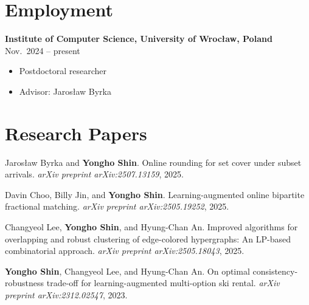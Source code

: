 \documentclass{article}
\newcommand{\killinitspace}{-0.7em}
\begin{document}
\section{Employment}
\textbf{Institute of Computer Science, University of Wrocław, Poland} \hfill Nov.~2024 -- present
\vspace{\killinitspace}
\begin{itemize}
\item Postdoctoral researcher
\item Advisor: Jarosław Byrka
\end{itemize}

\section{Research Papers}
Jaros{\l}aw Byrka and \textbf{Yongho Shin}. Online rounding for set cover under subset arrivals. \emph{arXiv preprint arXiv:2507.13159}, 2025.

Davin Choo, Billy Jin, and \textbf{Yongho Shin}. Learning-augmented online bipartite fractional matching. \emph{arXiv preprint arXiv:2505.19252}, 2025.

Changyeol Lee, \textbf{Yongho Shin}, and Hyung-Chan An. Improved algorithms for overlapping and robust clustering of edge-colored hypergraphs: An LP-based combinatorial approach. \emph{arXiv preprint arXiv:2505.18043}, 2025.

\textbf{Yongho Shin}, Changyeol Lee, and Hyung-Chan An. On optimal consistency-robustness trade-off for learning-augmented multi-option ski rental. \emph{arXiv preprint arXiv:2312.02547}, 2023.
\end{document}
